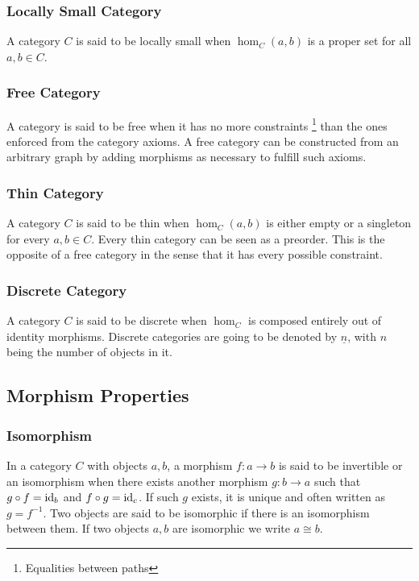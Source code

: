 \subsubsection*{Locally Small Category}
A category $C$ is said to be locally small when $\hom_C(a, b)$ is a
proper set for all $a,b\in C$. \parencite{awodey:category_theory}

\subsubsection*{Free Category}
A category is said to be free when it has no more constraints
\footnote{Equalities between paths} than the ones enforced from the category
axioms. \parencite{adamek_herrlich_strecker:joy_cats} A free category can be
constructed from an arbitrary graph by adding morphisms as necessary to fulfill
such axioms.

\subsubsection*{Thin Category}
A category $C$ is said to be thin when $\hom_C(a, b)$ is either empty or
a singleton for every $a,b\in C$. \parencite{adamek_herrlich_strecker:joy_cats}
Every thin category can be seen as a preorder. This is the opposite of a free
category in the sense that it has every possible constraint.

\subsubsection*{Discrete Category}
A category $C$ is said to be discrete when $\hom_C$ is composed entirely
out of identity morphisms. \parencite{awodey:category_theory} Discrete
categories are going to be denoted by $\underline{n}$, with $n$ being the number
of objects in it.

\subsection{Morphism Properties}

\subsubsection*{Isomorphism}
In a category $C$ with objects $a, b$, a morphism $f: a\to b$ is said to be
invertible or an isomorphism when there exists another morphism $g:b \to a$ such
that $g\circ f = \mathrm{id}_b$ and $f\circ g = \mathrm{id}_c$.
\parencite{maclane:working_mathematician}
If such $g$ exists, it is unique and often written as $g= f^{-1}$. Two objects
are said to be isomorphic if there is an isomorphism between them. If two
objects $a,b$ are isomorphic we write $a\cong b$.

